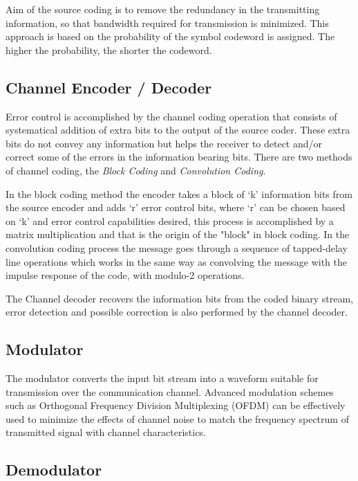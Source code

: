 Aim of the source coding is to remove the redundancy in the transmitting
information, so that bandwidth required for transmission is minimized. This
approach is based on the probability of the symbol codeword is assigned. The
higher the probability, the shorter the codeword.

\subsection{Channel Encoder / Decoder}

Error control is accomplished by the channel coding operation that consists of
systematical addition of extra bits to the output of the source coder. These
extra bits do not convey any information but helps the receiver to detect and/or
correct some of the errors in the information bearing bits. There are two
methods of channel coding, the \textit{Block Coding} and \textit{Convolution
Coding}.

In the block coding method the encoder takes a block of ‘k’ information bits
from the source encoder and adds ‘r’ error control bits, where ‘r’ can be chosen
based on ‘k’ and error control capabilities desired, this process is
accomplished by a matrix multiplication and that is the origin of the "block" in
block coding. In the convolution coding process the message goes through a
sequence of tapped-delay line operations which works in the same way as
convolving the message with the impulse response of the code, with modulo-2
operations.

The Channel decoder recovers the information bits from the coded binary stream,
error detection and possible correction is also performed by the channel
decoder.

\subsection{Modulator}

The modulator converts the input bit stream into a waveform suitable for
transmission over the communication channel. Advanced modulation schemes such as
Orthogonal Frequency Division Multiplexing (OFDM) can be effectively used to
minimize the effects of channel noise to match the frequency spectrum of
transmitted signal with channel characteristics.

\subsection{Demodulator}


